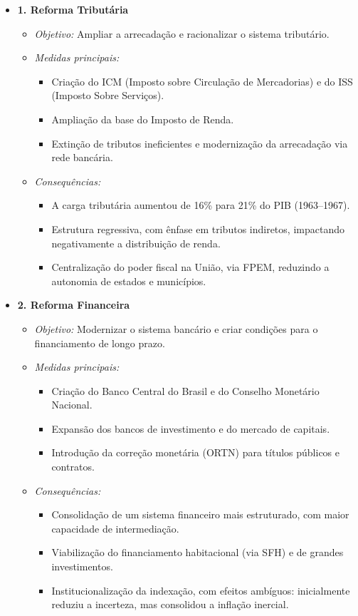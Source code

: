 \documentclass[a4paper,12pt]{article}[abntex2]
\begin{document}
\begin{itemize}
    \item \textbf{1. Reforma Tributária}
    \begin{itemize}
        \item \textit{Objetivo:} Ampliar a arrecadação e racionalizar o sistema tributário.
        \item \textit{Medidas principais:}
        \begin{itemize}
            \item Criação do ICM (Imposto sobre Circulação de Mercadorias) e do ISS (Imposto Sobre Serviços).
            \item Ampliação da base do Imposto de Renda.
            \item Extinção de tributos ineficientes e modernização da arrecadação via rede bancária.
        \end{itemize}
        \item \textit{Consequências:}
        \begin{itemize}
            \item A carga tributária aumentou de 16\% para 21\% do PIB (1963–1967).
            \item Estrutura regressiva, com ênfase em tributos indiretos, impactando negativamente a distribuição de renda.
            \item Centralização do poder fiscal na União, via FPEM, reduzindo a autonomia de estados e municípios.
        \end{itemize}
    \end{itemize}

    \item \textbf{2. Reforma Financeira}
    \begin{itemize}
        \item \textit{Objetivo:} Modernizar o sistema bancário e criar condições para o financiamento de longo prazo.
        \item \textit{Medidas principais:}
        \begin{itemize}
            \item Criação do Banco Central do Brasil e do Conselho Monetário Nacional.
            \item Expansão dos bancos de investimento e do mercado de capitais.
            \item Introdução da correção monetária (ORTN) para títulos públicos e contratos.
        \end{itemize}
        \item \textit{Consequências:}
        \begin{itemize}
            \item Consolidação de um sistema financeiro mais estruturado, com maior capacidade de intermediação.
            \item Viabilização do financiamento habitacional (via SFH) e de grandes investimentos.
            \item Institucionalização da indexação, com efeitos ambíguos: inicialmente reduziu a incerteza, mas consolidou a inflação inercial.
        \end{itemize}
    \end{itemize}


\end{itemize}
\end{document}
